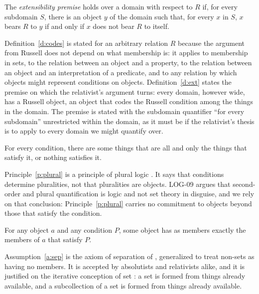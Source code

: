 \documentclass{situationist-preprint}
\begin{document}
\begin{definition}\label{d:ext}
The \emph{extensibility premise} holds over a domain with respect to $R$ if, for every subdomain $S$, there is an object $y$ of the domain such that, for every $x$ in $S$, $x$ bears $R$ to $y$ if and only if $x$ does not bear $R$ to itself.
\end{definition}

Definition~\ref{d:codes} is stated for an arbitrary relation $R$ because the argument from Russell does not depend on what membership is: it applies to membership in sets, to the relation between an object and a property, to the relation between an object and an interpretation of a predicate, and to any relation by which objects might represent conditions on objects. Definition~\ref{d:ext} states the premise on which the relativist's argument turns: every domain, however wide, has a Russell object, an object that codes the Russell condition among the things in the domain. The premise is stated with the subdomain quantifier \enquote{for every subdomain} unrestricted within the domain, as it must be if the relativist's thesis is to apply to every domain we might quantify over.

\begin{principle}\label{p:plural}
For every condition, there are some things that are all and only the things that satisfy it, or nothing satisfies it.
\end{principle}

Principle~\ref{p:plural} is a principle of plural logic \citep{Boolos1984}. It says that conditions determine pluralities, not that pluralities are objects. LOG-09 argues that second-order and plural quantification is logic and not set theory in disguise, and we rely on that conclusion: Principle~\ref{p:plural} carries no commitment to objects beyond those that satisfy the condition.

\begin{assumption}[Separation]\label{a:sep}
For any object $a$ and any condition $P$, some object has as members exactly the members of $a$ that satisfy $P$.
\end{assumption}

Assumption~\ref{a:sep} is the axiom of separation of \citet{Zermelo1908}, generalized to treat non-sets as having no members. It is accepted by absolutists and relativists alike, and it is justified on the iterative conception of set \citep{Boolos1971}: a set is formed from things already available, and a subcollection of a set is formed from things already available.
\end{document}
